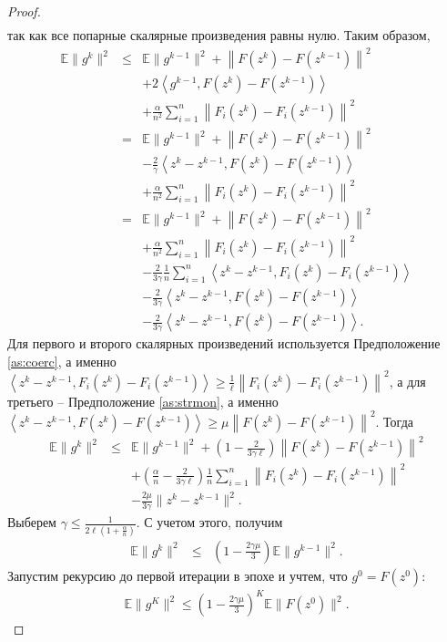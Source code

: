 \documentclass{ProcISPRAS}
\begin{document}
\begin{proof}
\begin{eqnarray*}
\end{eqnarray*}
так как все попарные скалярные произведения равны нулю. Таким образом,
\begin{eqnarray*}
    \mathbb E\| g^{k} \|^2 &\leqslant& \mathbb E\|g^{k-1}\|^2 + \left\|F(z^k) - F(z^{k-1})\right\|^2 \\
    & & + 2\left\langle g^{k-1}, F(z^k) - F(z^{k-1})\right\rangle\\
    & & + \frac{\alpha}{n^2}\sum\limits_{i=1}^n\left\|F_i(z^k) - F_i(z^{k-1})\right\|^2\\
    &=& \mathbb E\|g^{k-1}\|^2 + \left\|F(z^k) - F(z^{k-1})\right\|^2 \\
    & & - \frac{2}{\gamma}\left\langle z^{k} - z^{k-1}, F(z^k) - F(z^{k-1})\right\rangle\\
    & & + \frac{\alpha}{n^2}\sum\limits_{i=1}^n\left\|F_i(z^k) - F_i(z^{k-1})\right\|^2 \\
    &=& \mathbb E\|g^{k-1}\|^2 + \left\|F(z^k) - F(z^{k-1})\right\|^2\\
    & & + \frac{\alpha}{n^2}\sum\limits_{i=1}^n\left\|F_i(z^k) - F_i(z^{k-1})\right\|^2 \\
    & & - \frac{2}{3\gamma}\frac{1}{n}\sum\limits_{i=1}^n\left\langle z^{k} - z^{k-1}, F_i(z^k) - F_i(z^{k-1})\right\rangle \\
    & & - \frac{2}{3\gamma}\left\langle z^{k} - z^{k-1}, F(z^k) - F(z^{k-1})\right\rangle \\
    & &- \frac{2}{3\gamma}\left\langle z^{k} - z^{k-1}, F(z^k) - F(z^{k-1})\right\rangle.
\end{eqnarray*}
Для первого и второго скалярных произведений используется Предположение \ref{as:coerc}, а именно $\left\langle z^k - z^{k-1}, F_i(z^k) - F_i(z^{k-1})\right\rangle \geqslant \frac{1}{\ell}\left\|F_i(z^k) - F_i(z^{k-1})\right\|^2$, а для третьего -- Предположение \ref{as:strmon}, а именно $\left\langle z^k - z^{k-1}, F(z^k) - F(z^{k-1})\right\rangle \geqslant \mu\left\|F(z^k) - F(z^{k-1})\right\|^2$. Тогда
\begin{eqnarray*}
    \mathbb E\| g^{k} \|^2 &\leqslant& \mathbb E\|g^{k-1}\|^2 + \left(1 - \frac{2}{3\gamma \ell} \right) \left\|F(z^k) - F(z^{k-1})\right\|^2\\ 
    & & + \left(\frac{\alpha}{n} - \frac{2}{3\gamma \ell} \right) \frac{1}{n}\sum\limits_{i=1}^n\left\|F_i(z^k) - F_i(z^{k-1})\right\|^2\\
    & & - \frac{2\mu}{3\gamma}\|z^k - z^{k-1}\|^2.
\end{eqnarray*}
Выберем $\gamma \leqslant \frac{1}{2\ell\left(1 + \frac{\alpha}{n}\right)}$. С учетом этого, получим
\begin{eqnarray*}
    \mathbb E\| g^{k} \|^2 &\leqslant& \left(1 - \frac{2\gamma\mu}{3}\right)\mathbb E\|g^{k-1}\|^2.
\end{eqnarray*}
Запустим рекурсию до первой итерации в эпохе и учтем, что $g^0 = F(z^0)$:
\begin{eqnarray*}
    \mathbb E\| g^{K} \|^2 \leqslant \left(1 - \frac{2\gamma\mu}{3}\right)^{K}\mathbb E\|F(z^0)\|^2.
\end{eqnarray*}
\end{proof}
\end{document}
